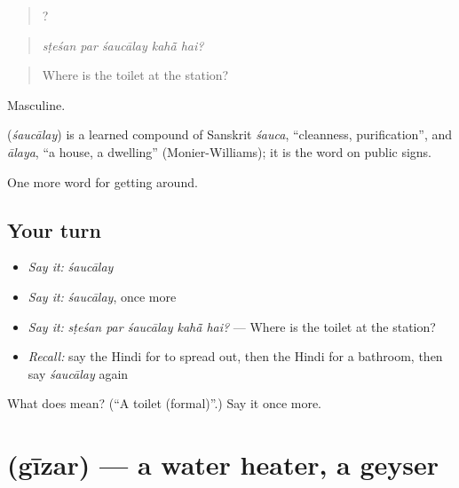 \begin{quote}
    ?
\end{quote}

\begin{quote}
\emph{sṭeśan par śaucālay kahā̃ hai?}
\end{quote}

\begin{quote}
Where is the toilet at the station?
\end{quote}

Masculine.

\begin{cousinweb}
\textbf{} (\emph{śaucālay}) is a learned compound of Sanskrit \emph{śauca}, \textquotedblleft{}cleanness, purification\textquotedblright{}, and \emph{ālaya}, \textquotedblleft{}a house, a dwelling\textquotedblright{} (Monier-Williams); it is the word on public signs.
\end{cousinweb}

\begin{grammarlens}[title={What you've built}]
One more word for getting around.
\end{grammarlens}

\subsection*{Your turn}
\begin{itemize}
\raggedright
  \item \emph{Say it:} \emph{śaucālay}
  \item \emph{Say it:} \emph{śaucālay}, once more
  \item \emph{Say it:} \emph{sṭeśan par śaucālay kahā̃ hai?} — Where is the toilet at the station?
  \item \emph{Recall:} say the Hindi for to spread out, then the Hindi for a bathroom, then say \emph{śaucālay} again
\end{itemize}

\begin{tcolorbox}[breakable,colback=teal!4,colframe=teal!35!black,title={Before you move on}]
What does  mean? (\textquotedblleft{}A toilet (formal)\textquotedblright{}.) Say it once more.
\end{tcolorbox}
\section[\texorpdfstring{\hi{गीज़र} (gīzar)}{गीज़र (gīzar)}]{ (gīzar) — a water heater, a geyser}

